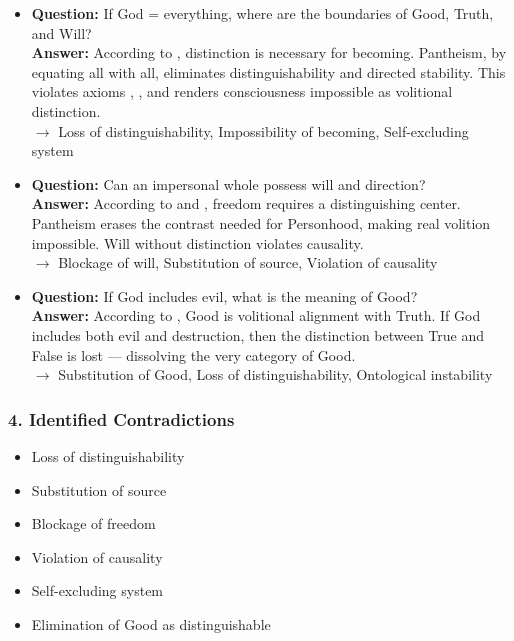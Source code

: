 \documentclass[12pt]{article}
\begin{document}
\begin{itemize}
\item \textbf{Question:} If God = everything, where are the boundaries of Good, Truth, and Will?\\
\textbf{Answer:} According to \text{[9]}, distinction is necessary for becoming. Pantheism, by equating all with all, eliminates distinguishability and directed stability. This violates axioms \text{[1]}, \text{[2]}, \text{[4.1]} and renders consciousness impossible as volitional distinction.\\
$\rightarrow$ Loss of distinguishability, Impossibility of becoming, Self-excluding system

\item \textbf{Question:} Can an impersonal whole possess will and direction?\\
\textbf{Answer:} According to \text{[12.2]} and \text{[11.1]}, freedom requires a distinguishing center. Pantheism erases the contrast needed for Personhood, making real volition impossible. Will without distinction violates causality.\\
$\rightarrow$ Blockage of will, Substitution of source, Violation of causality

\item \textbf{Question:} If God includes evil, what is the meaning of Good?\\
\textbf{Answer:} According to \text{[11.3]}, Good is volitional alignment with Truth. If God includes both evil and destruction, then the distinction between True and False is lost — dissolving the very category of Good.\\
$\rightarrow$ Substitution of Good, Loss of distinguishability, Ontological instability
\end{itemize}

\subsubsection*{4. Identified Contradictions}

\begin{itemize}
\item Loss of distinguishability
\item Substitution of source
\item Blockage of freedom
\item Violation of causality
\item Self-excluding system
\item Elimination of Good as distinguishable
\end{itemize}
\end{document}
